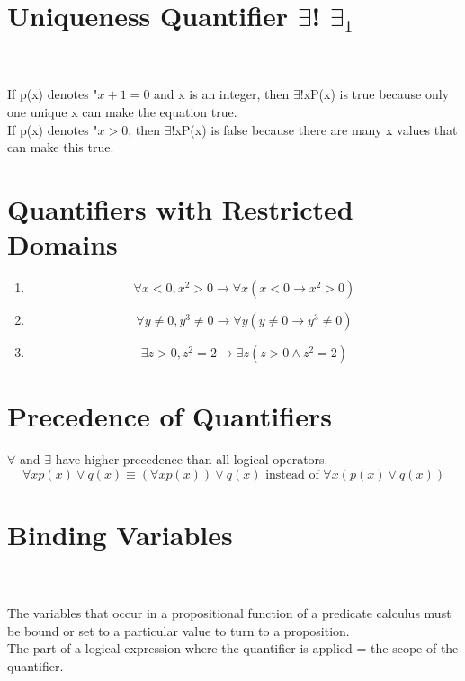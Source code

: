 \documentclass{article}
\begin{document}
\section{Uniqueness Quantifier $\exists$! $\exists_{1}$}
\\
\\
If p(x) denotes "$x+1=0$ and x is an integer, then $\exists$!xP(x) is true because only one unique x can make the equation true.\\
If p(x) denotes "$x > 0$, then $\exists$!xP(x) is false because there are many x values that can make this true.

\section{Quantifiers with Restricted Domains}
\begin{enumerate}
    \item
        \begin{displaymath}
        \forall x < 0, x^{2} > 0 \to \forall x(x<0\to x^{2}>0)
        \end{displaymath}

    \item
        \begin{displaymath}
        \forall y \neq 0, y^{3} \neq 0 \to \forall y(y\neq 0 \to y^{3}\neq 0)
        \end{displaymath}

    \item
        \begin{displaymath}
        \exists z > 0, z^{2} = 2 \to \exists z(z > 0 \wedge z^{2}=2)
        \end{displaymath}
\end{enumerate}

\section{Precedence of Quantifiers}
$\forall$ and $\exists$ have higher precedence than all logical operators.\\

\begin{displaymath}
\forall x p(x)\vee q(x) \equiv (\forall x p(x))\vee q(x) \text{ instead of } \forall x (p(x)\vee q(x))
\end{displaymath}

\section{Binding Variables}
\\
\\
The variables that occur in a propositional function of a predicate calculus must be bound or set to a particular value to turn to a proposition.\\
The part of a logical expression where the quantifier is applied = the scope of the quantifier.
\end{document}
